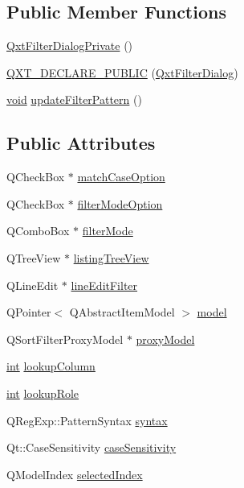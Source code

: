 \subsection*{Public Member Functions}
\begin{DoxyCompactItemize}
\item 
\hyperlink{class_qxt_filter_dialog_private_ad14eaeed2737989c6ea2a00e34caed78}{Qxt\-Filter\-Dialog\-Private} ()
\item 
\hyperlink{class_qxt_filter_dialog_private_a5a866c7590c1092788353e00cd7d7497}{Q\-X\-T\-\_\-\-D\-E\-C\-L\-A\-R\-E\-\_\-\-P\-U\-B\-L\-I\-C} (\hyperlink{class_qxt_filter_dialog}{Qxt\-Filter\-Dialog})
\item 
\hyperlink{group___u_a_v_objects_plugin_ga444cf2ff3f0ecbe028adce838d373f5c}{void} \hyperlink{class_qxt_filter_dialog_private_af77785ab97f1acd93f013577c62ab71c}{update\-Filter\-Pattern} ()
\end{DoxyCompactItemize}
\subsection*{Public Attributes}
\begin{DoxyCompactItemize}
\item 
Q\-Check\-Box $\ast$ \hyperlink{class_qxt_filter_dialog_private_a80eb64e05723317e25a6f5c25a420f56}{match\-Case\-Option}
\item 
Q\-Check\-Box $\ast$ \hyperlink{class_qxt_filter_dialog_private_a8a655a17bdba57a7231278803a371811}{filter\-Mode\-Option}
\item 
Q\-Combo\-Box $\ast$ \hyperlink{class_qxt_filter_dialog_private_a8061d12ff457098a210fe833dcf5e61f}{filter\-Mode}
\item 
Q\-Tree\-View $\ast$ \hyperlink{class_qxt_filter_dialog_private_a27b456f64e9f4984c92ea7600cf72d7d}{listing\-Tree\-View}
\item 
Q\-Line\-Edit $\ast$ \hyperlink{class_qxt_filter_dialog_private_a918b1db4ce1899beb698d1a283ee4362}{line\-Edit\-Filter}
\item 
Q\-Pointer$<$ Q\-Abstract\-Item\-Model $>$ \hyperlink{class_qxt_filter_dialog_private_a24103d685cb7f1b6463c3d0b8346d9e2}{model}
\item 
Q\-Sort\-Filter\-Proxy\-Model $\ast$ \hyperlink{class_qxt_filter_dialog_private_a8f46114e5997ecbf8c86b58b1241e426}{proxy\-Model}
\item 
\hyperlink{ioapi_8h_a787fa3cf048117ba7123753c1e74fcd6}{int} \hyperlink{class_qxt_filter_dialog_private_ac61ac4e3ea393816bb28589ba85133cd}{lookup\-Column}
\item 
\hyperlink{ioapi_8h_a787fa3cf048117ba7123753c1e74fcd6}{int} \hyperlink{class_qxt_filter_dialog_private_a81c1d2407302c80a8c04f6dfc66451e0}{lookup\-Role}
\item 
Q\-Reg\-Exp\-::\-Pattern\-Syntax \hyperlink{class_qxt_filter_dialog_private_a85973f0d91d9bdcf58009d7ff55a1a64}{syntax}
\item 
Qt\-::\-Case\-Sensitivity \hyperlink{class_qxt_filter_dialog_private_a3be71668706b97a9d69292fe4b944b61}{case\-Sensitivity}
\item 
Q\-Model\-Index \hyperlink{class_qxt_filter_dialog_private_ad84e2abdca94818ab25f96168a481099}{selected\-Index}
\end{DoxyCompactItemize}
